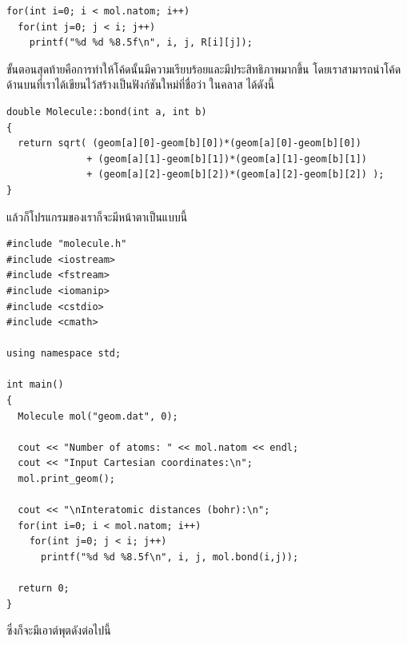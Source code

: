 \vspace{5pt}

\begin{lstlisting}[style=MyC++]
for(int i=0; i < mol.natom; i++)
  for(int j=0; j < i; j++)
    printf("%d %d %8.5f\n", i, j, R[i][j]);
\end{lstlisting}

\vspace{5pt}

ขั้นตอนสุดท้ายคือการทำให้โค้ดนั้นมีความเรียบร้อยและมีประสิทธิภาพมากขึ้น โดยเราสามารถนำโค้ดด้านบนที่เราได้เขียนไว้สร้างเป็นฟังก์ชันใหม่ที่ชื่อว่า
 ในคลาส  ได้ดังนี้

\vspace{5pt}

\begin{lstlisting}[style=MyC++]
double Molecule::bond(int a, int b)
{
  return sqrt( (geom[a][0]-geom[b][0])*(geom[a][0]-geom[b][0])
              + (geom[a][1]-geom[b][1])*(geom[a][1]-geom[b][1])
              + (geom[a][2]-geom[b][2])*(geom[a][2]-geom[b][2]) );
}
\end{lstlisting}

\vspace{5pt}

แล้วก็โปรแกรมของเราก็จะมีหน้าตาเป็นแบบนี้

\vspace{5pt}

\begin{lstlisting}[style=MyC++]
#include "molecule.h"
#include <iostream>
#include <fstream>
#include <iomanip>
#include <cstdio>
#include <cmath>

using namespace std;
  
int main()
{
  Molecule mol("geom.dat", 0);
  
  cout << "Number of atoms: " << mol.natom << endl;
  cout << "Input Cartesian coordinates:\n";
  mol.print_geom();
  
  cout << "\nInteratomic distances (bohr):\n";
  for(int i=0; i < mol.natom; i++)
    for(int j=0; j < i; j++)
      printf("%d %d %8.5f\n", i, j, mol.bond(i,j));
      
  return 0;
}
\end{lstlisting}
%
\vspace{5pt}
%
ซึ่งก็จะมีเอาต์พุตดังต่อไปนี้

\vspace{5pt}

